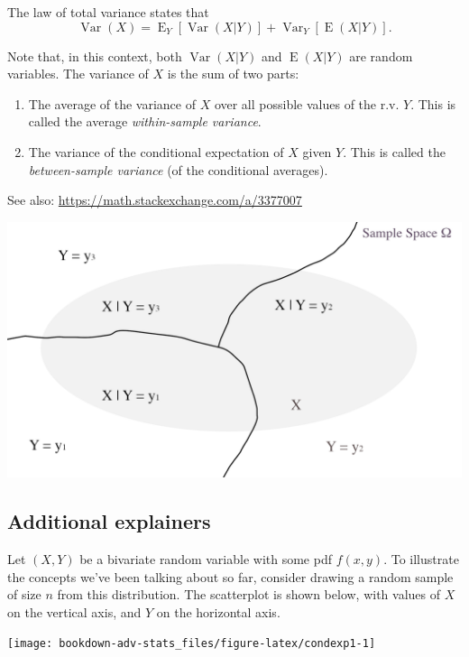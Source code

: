 \documentclass[
]{book}
\providecommand{\tightlist}{%
  \setlength{\itemsep}{0pt}\setlength{\parskip}{0pt}}
\DeclareMathOperator{\E}{E}
\DeclareMathOperator{\Var}{Var}
\theoremstyle{definition}
\theoremstyle{definition}
\theoremstyle{definition}
\theoremstyle{definition}
\theoremstyle{remark}
\begin{document}
The law of total variance states that
\[
\Var(X) = {\E}_Y\left[\Var(X|Y) \right] + {\Var}_Y\left[\E(X|Y) \right].
\]

Note that, in this context, both \(\Var(X|Y)\) and \(\E(X|Y)\) are random variables.
The variance of \(X\) is the sum of two parts:

\begin{enumerate}
\def\labelenumi{\arabic{enumi}.}
\tightlist
\item
  The average of the variance of \(X\) over all possible values of the r.v. \(Y\). This is called the average \emph{within-sample variance}.
\item
  The variance of the conditional expectation of \(X\) given \(Y\). This is called the \emph{between-sample variance} (of the conditional averages).
\end{enumerate}

See also: \url{https://math.stackexchange.com/a/3377007}

\begin{center}\includegraphics[width=0.8\linewidth]{figure/lawoftotalvariance} \end{center}

\hypertarget{additional-explainers}{%
\subsection{Additional explainers}\label{additional-explainers}}

Let \((X,Y)\) be a bivariate random variable with some pdf \(f(x,y)\).
To illustrate the concepts we've been talking about so far, consider drawing a random sample of size \(n\) from this distribution.
The scatterplot is shown below, with values of \(X\) on the vertical axis, and \(Y\) on the horizontal axis.

\begin{center}\texttt{[image: bookdown-adv-stats\_files/figure-latex/condexp1-1]} \end{center}
\end{document}
